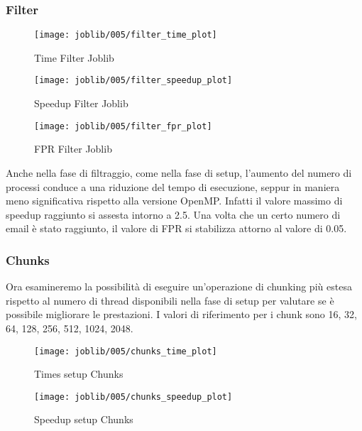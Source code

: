 \subsubsection{Filter}\label{subsubsec:joblib-filter}
\begin{figure}[H]
    \centering
    \texttt{[image: joblib/005/filter\_time\_plot]}
        \caption{Time Filter Joblib}\label{fig:005-filter_time_joblib}
    \endminipage\hfill
    \texttt{[image: joblib/005/filter\_speedup\_plot]}
        \caption{Speedup Filter Joblib}\label{fig:005-filter_speedup_joblib}
    \endminipage\hfill
\end{figure}
\begin{figure}[H]
    \centering
    \texttt{[image: joblib/005/filter\_fpr\_plot]}
        \caption{FPR Filter Joblib}\label{fig:005-filter_fpr_joblib}
    \endminipage\hfill
\end{figure}

Anche nella fase di filtraggio, come nella fase di setup, l'aumento del numero di processi conduce a una riduzione del
tempo di esecuzione, seppur in maniera meno significativa rispetto alla versione OpenMP\@.
Infatti il valore massimo di speedup raggiunto si assesta intorno a 2.5.
Una volta che un certo numero di email è stato raggiunto, il valore di FPR si stabilizza attorno al valore di 0.05.

\subsubsection{Chunks}\label{subsubsec:005-chunks}
Ora esamineremo la possibilità di eseguire un'operazione di chunking più estesa rispetto al numero di thread disponibili
nella fase di setup per valutare se è possibile migliorare le prestazioni.
I valori di riferimento per i chunk sono 16, 32, 64, 128, 256, 512, 1024, 2048.

\begin{figure}[H]
    \centering
    \texttt{[image: joblib/005/chunks\_time\_plot]}
        \caption{Times setup Chunks}\label{fig:005-chunks_time}
    \endminipage\hfill
    \texttt{[image: joblib/005/chunks\_speedup\_plot]}
        \caption{Speedup setup Chunks}\label{fig:005-chunks_speedup}
    \endminipage\hfill
\end{figure}

